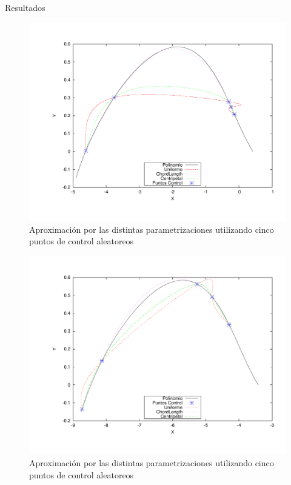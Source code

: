 \begin{section}{Resultados}
	\begin{figure}[H]
	  \centering
		\includegraphics[width=14cm]{graficos/5p_r.pdf}
	  \caption{Aproximación por las distintas parametrizaciones utilizando cinco puntos de control aleatoreos}
	  \label{fig:5p_r}
	\end{figure}
	
	\VSP
	
	\begin{figure}[H]
	  \centering
		\includegraphics[width=14cm]{graficos/5p.pdf}
	  \caption{Aproximación por las distintas parametrizaciones utilizando cinco puntos de control aleatoreos}
	  \label{fig:5p}
	\end{figure}
	

\end{section}
